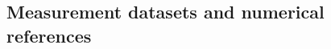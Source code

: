 \documentclass[pdflatex,sn-nature]{sn-jnl}%
\theoremstyle{thmstyleone}%
\theoremstyle{thmstyletwo}%
\theoremstyle{thmstylethree}%
\begin{document}
\subsection{Measurement datasets and numerical references}
\end{document}
